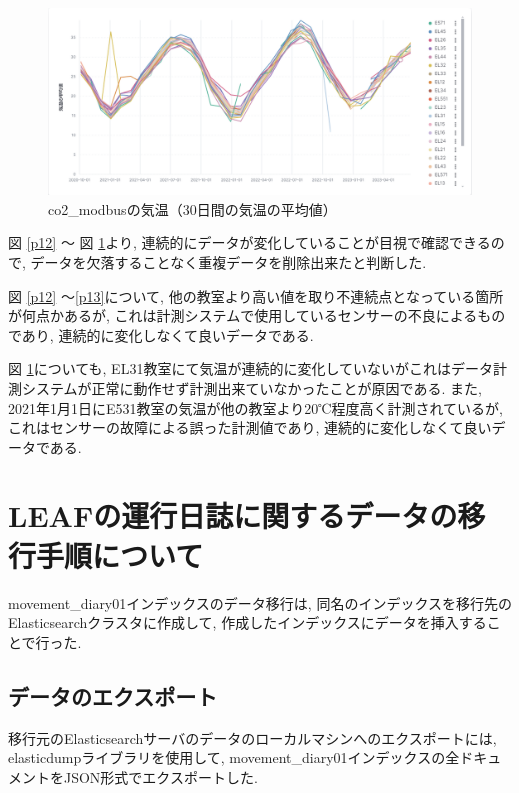 \begin{figure}[H]
  \hspace*{-2cm} %
  \centering %
  \includegraphics[width=170mm]{sotu/figure/temp.png}
  \caption{co2\_modbusの気温（30日間の気温の平均値）}
  \label{p14}
\end{figure}

図 \ref{p12} 〜 図 \ref{p14}より, 連続的にデータが変化していることが目視で確認できるので, データを欠落することなく重複データを削除出来たと判断した.

図 \ref{p12} 〜\ref{p13}について, 他の教室より高い値を取り不連続点となっている箇所が何点かあるが, これは計測システムで使用しているセンサーの不良によるものであり, 連続的に変化しなくて良いデータである.

図 \ref{p14}についても, EL31教室にて気温が連続的に変化していないがこれはデータ計測システムが正常に動作せず計測出来ていなかったことが原因である. また, 2021年1月1日にE531教室の気温が他の教室より20℃程度高く計測されているが, これはセンサーの故障による誤った計測値であり, 連続的に変化しなくて良いデータである.

\section{LEAFの運行日誌に関するデータの移行手順について}

movement\_diary01インデックスのデータ移行は, 同名のインデックスを移行先のElasticsearchクラスタに作成して, 作成したインデックスにデータを挿入することで行った.

\subsection{データのエクスポート}
移行元のElasticsearchサーバのデータのローカルマシンへのエクスポートには, elasticdumpライブラリを使用して, movement\_diary01インデックスの全ドキュメントをJSON形式でエクスポートした.

